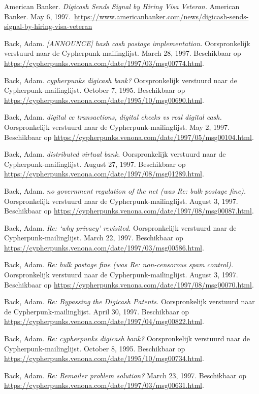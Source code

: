 \documentclass[
  a5paper,
  smalldemyvopaper,11pt,twoside,onecolumn,openright,extrafontsizes,
hidelinks]{memoir}
\begin{document}
{\footnotesize

American Banker. \emph{Digicash Sends Signal by Hiring Visa Veteran.}
American Banker. May 6,
1997.~\url{https://www.americanbanker.com/news/digicash-sends-signal-by-hiring-visa-veteran}

Back, Adam. \emph{{[}ANNOUNCE{]} hash cash postage implementation.}
Oorspronkelijk verstuurd naar de Cypherpunk-mailinglijst. March 28,
1997. Beschikbaar op
\url{https://cypherpunks.venona.com/date/1997/03/msg00774.html}.

Back, Adam. \emph{cypherpunks digicash bank?} Oorspronkelijk verstuurd
naar de Cypherpunk-mailinglijst. October 7, 1995. Beschikbaar op
\url{https://cypherpunks.venona.com/date/1995/10/msg00690.html}.

Back, Adam. \emph{digital cc transactions, digital checks vs real
digital cash.} Oorspronkelijk verstuurd naar de Cypherpunk-mailinglijst.
May 2, 1997. Beschikbaar op
\url{https://cypherpunks.venona.com/date/1997/05/msg00104.html}.

Back, Adam. \emph{distributed virtual bank.} Oorspronkelijk verstuurd
naar de Cypherpunk-mailinglijst. August 27, 1997. Beschikbaar op
\url{https://cypherpunks.venona.com/date/1997/08/msg01289.html}.

Back, Adam. \emph{no government regulation of the net (was Re: bulk
postage fine).} Oorspronkelijk verstuurd naar de
Cypherpunk-mailinglijst. August 3, 1997. Beschikbaar op
\url{https://cypherpunks.venona.com/date/1997/08/msg00087.html}.

Back, Adam. \emph{Re: `why privacy' revisited.} Oorspronkelijk verstuurd
naar de Cypherpunk-mailinglijst. March 22, 1997. Beschikbaar op
\url{https://cypherpunks.venona.com/date/1997/03/msg00586.html}.

Back, Adam. \emph{Re: bulk postage fine (was Re: non-censorous spam
control).} Oorspronkelijk verstuurd naar de Cypherpunk-mailinglijst.
August 3, 1997. Beschikbaar op
\url{https://cypherpunks.venona.com/date/1997/08/msg00070.html}.

Back, Adam. \emph{Re: Bypassing the Digicash Patents.} Oorspronkelijk
verstuurd naar de Cypherpunk-mailinglijst. April 30, 1997. Beschikbaar
op \url{https://cypherpunks.venona.com/date/1997/04/msg00822.html}.

Back, Adam. \emph{Re: cypherpunks digicash bank?} Oorspronkelijk
verstuurd naar de Cypherpunk-mailinglijst. October 8, 1995. Beschikbaar
op \url{https://cypherpunks.venona.com/date/1995/10/msg00734.html}.

Back, Adam. \emph{Re: Remailer problem solution?} March 23, 1997.
Beschikbaar op
\url{https://cypherpunks.venona.com/date/1997/03/msg00631.html}.

}
\end{document}
